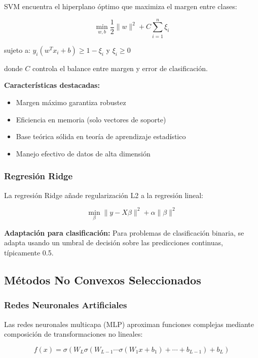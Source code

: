 \documentclass[12pt,a4paper]{article}
\begin{document}
SVM \cite{vapnik1995} encuentra el hiperplano óptimo que maximiza el margen entre clases:

\begin{equation}
\min_{w,b} \frac{1}{2}\|w\|^2 + C\sum_{i=1}^{n} \xi_i
\end{equation}

sujeto a: $y_i(w^T x_i + b) \geq 1 - \xi_i$ y $\xi_i \geq 0$

donde $C$ controla el balance entre margen y error de clasificación.

\textbf{Características destacadas:}
\begin{itemize}
    \item Margen máximo garantiza robustez
    \item Eficiencia en memoria (solo vectores de soporte)
    \item Base teórica sólida en teoría de aprendizaje estadístico
    \item Manejo efectivo de datos de alta dimensión
\end{itemize}

\subsubsection{Regresión Ridge}

La regresión Ridge \cite{hoerl1970} añade regularización L2 a la regresión lineal:

\begin{equation}
\min_{\beta} \|y - X\beta\|^2 + \alpha\|\beta\|^2
\end{equation}

\textbf{Adaptación para clasificación:}
Para problemas de clasificación binaria, se adapta usando un umbral de decisión sobre las predicciones continuas, típicamente 0.5.

\subsection{Métodos No Convexos Seleccionados}

\subsubsection{Redes Neuronales Artificiales}

Las redes neuronales multicapa (MLP) \cite{goodfellow2016} aproximan funciones complejas mediante composición de transformaciones no lineales:

\begin{equation}
f(x) = \sigma(W_L \sigma(W_{L-1} \cdots \sigma(W_1 x + b_1) + \cdots + b_{L-1}) + b_L)
\end{equation}
\end{document}
